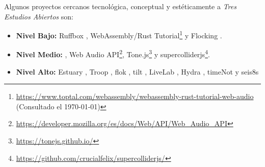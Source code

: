 
Algunos proyectos cercanos tecnológica, conceptual y estéticamente a \textit{Tres Estudios Abiertos} son: 

\begin{itemize}

\item \textbf{Nivel Bajo:} Ruffbox \citep{ruffbox}, WebAssembly/Rust Tutorial\footnote{\url{https://www.toptal.com/webassembly/webassembly-rust-tutorial-web-audio} (Consultado el \today)} y Flocking \citep{flocking}.
\item \textbf{Nivel Medio:} \citep{supercolliderweb}, Web Audio API\footnote{\url{https://developer.mozilla.org/es/docs/Web/API/Web_Audio_API}}, Tone.js\footnote{\url{https://tonejs.github.io/}} y supercolliderjs\footnote{\url{https://github.com/crucialfelix/supercolliderjs/}}.
\item \textbf{Nivel Alto:} Estuary \citep{estuary}, Troop \citep{Troop}, flok \citep{flok}, tilt \citep{tilt}, LiveLab \citep{livelab}, Hydra \citep{hydra}, timeNot \citep{timenot} y seis8s \citep{seis8s}
  
\end{itemize}
